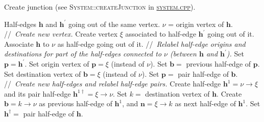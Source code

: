 \documentclass[aps, superscriptaddress, notitlepage]{revtex4-1}
\providecommand{\LINECOMMENT}[1]{\STATEx//~{\em#1}}
\begin{document}
\begin{algorithm}[H]
\caption{Create junction (see \textsc{System::createJunction} in \href{../system.cpp}{\textsc{system.cpp}}).}
\label{alg:merge}
\begin{algorithmic}[1]
\REQUIRE Half-edges $\boldsymbol{h}$ and $\boldsymbol{h}^{\prime}$ going out of the same vertex. 
\STATE $\nu$ = origin vertex of $\boldsymbol{h}$. 
\LINECOMMENT{Create new vertex.}
\STATE Create vertex $\xi$ associated to half-edge $\boldsymbol{h}^{\prime}$ going out of it.
\STATE Associate $\boldsymbol{h}$ to $\nu$ as half-edge going out of it.
\LINECOMMENT{Relabel half-edge origins and destinations for part of the half-edges connected to $\nu$ (between $\boldsymbol{h}$ and $\boldsymbol{h}^{\prime}$).}
\STATE Set $\boldsymbol{p} = \boldsymbol{h}^{\prime}$.
    \STATE Set origin vertex of $\boldsymbol{p} = \xi$ (instead of $\nu$).
    \STATE Set $\boldsymbol{b} =$ previous half-edge of $\boldsymbol{p}$.
    \STATE Set destination vertex of $\boldsymbol{b} = \xi$ (instead of $\nu$).
    \STATE Set $\boldsymbol{p} =$ pair half-edge of $\boldsymbol{b}$.
\ENDWHILE
\LINECOMMENT{Create new half-edges and relabel half-edge pairs.}
\STATE Create half-edge $\boldsymbol{h}^{1} = \nu \to \xi$ and its pair half-edge $\boldsymbol{h}^{1\dagger} = \xi \to \nu$. 
\STATE Set $k =$ destination vertex of $\boldsymbol{h}$.
\STATE Create $\boldsymbol{b}  = k \to \nu$ as previous half-edge of $\boldsymbol{h}^1$, and $\boldsymbol{n} = \xi \to k$ as next half-edge of $\boldsymbol{h}^1$. 
\STATE Set $\boldsymbol{h}^{\dagger} =$ pair half-edge of $\boldsymbol{h}$. 
 
 
\end{algorithmic}
\end{algorithm}
\end{document}
